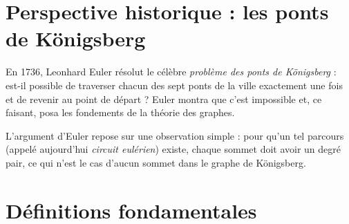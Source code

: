 \documentclass[12pt,a4paper,openany]{book}
\theoremstyle{definition}
\theoremstyle{plain}
\theoremstyle{remark}
\begin{document}
\section{Perspective historique : les ponts de Königsberg}
\label{sec:konigsberg}

En 1736, Leonhard Euler résolut le célèbre \emph{problème des ponts
de Königsberg} : est-il possible de traverser chacun des sept ponts de la ville
exactement une fois et de revenir au point de départ ? Euler montra que c'est
impossible et, ce faisant, posa les fondements de la théorie des graphes.

\begin{center}
\label{fig:konigsberg}
\end{center}

L'argument d'Euler repose sur une observation simple : pour qu'un tel parcours
(appelé aujourd'hui \emph{circuit eulérien})
existe, chaque sommet doit avoir un degré pair, ce qui n'est le cas d'aucun
sommet dans le graphe de Königsberg.

\section{Définitions fondamentales}
\label{sec:graph-def}
\end{document}
